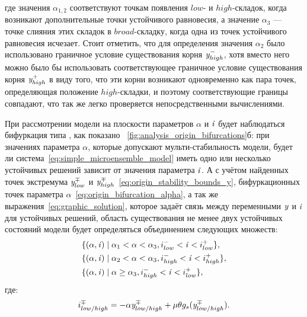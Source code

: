 где значения $\alpha_{1,2}$ соответствуют точкам появления $low$- и $high$-складок, когда возникают дополнительные точки устойчивого равновесия, а значение $\alpha_{3}$ --- точке слияния этих складок в $broad$-складку, когда одна из точек устойчивого равновесия исчезает. Стоит отметить, что для определения значения $\alpha_{2}$ было использовано граничное условие существования корня $\mathit{y}^{-}_{high}$, хотя вместо него можно было бы использовать соответствующее граничное условие существования корня $\mathit{y}^{+}_{high}$ в виду того, что эти корни возникают одновременно как пара точек, определяющая положение $high$-складки, и поэтому соответствующие границы совпадают, что так же легко проверяется непосредственными вычислениями.

При рассмотрении модели на плоскости параметров $\alpha$ и $\mathit{i}$ будет наблюдаться бифуркация типа , как показано \onfigure~\ref{fig:analysis_origin_bifurcations}б: при значениях параметра $\alpha$, которые допускают мульти-стабильность модели, будет ли система~\eqref{eq:simple_microensemble_model} иметь одно или несколько устойчивых решений зависит от значения параметра $\mathit{i}$. А с учётом найденных точек экстремума $\mathit{y}^{\mp}_{low}$ и $\mathit{y}^{\mp}_{high}$~\eqref{eq:origin_stability_bounds_y}, бифуркационных точек параметра $\alpha$~\eqref{eq:origin_bifurcation_alpha}, а так же выражения~\eqref{eq:graphic_solution}, которое задаёт связь между переменными $\mathit{y}$ и $\mathit{i}$ для устойчивых решений, область существования не менее двух устойчивых состояний модели будет определяться объединением следующих множеств:
\begin{equation}
    \label{eq:origin_stability_area}
    \begin{aligned}
        &\{ (\alpha, \mathit{i}) \mid \alpha_{1} < \alpha < \alpha_{3}, i^{-}_{low} < \mathit{i} < i^{+}_{low} \}, \\
        &\{ (\alpha, \mathit{i}) \mid \alpha_{2} < \alpha < \alpha_{3}, i^{-}_{high} < \mathit{i} < i^{+}_{high} \}, \\
        &\{ (\alpha, \mathit{i}) \mid \alpha \ge \alpha_{3}, i^{-}_{high} < \mathit{i} < i^{+}_{low} \}, \\
    \end{aligned}
\end{equation}
где:
\begin{equation}
    \label{eq:origin_stability_bounds_i}
    i^{\mp}_{low/high} = -\alpha \mathit{y}^{\mp}_{low/high} + \mu \theta g_{s}(\mathit{y}^{\mp}_{low/high}).
\end{equation}

